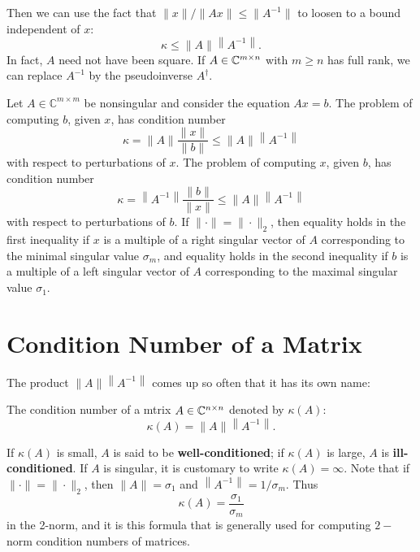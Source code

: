 Then we can use the fact that $\|x\|/ \|Ax\| \le \|A^{-1}\|$ to loosen to a bound independent of $x$: 
\[
    \kappa \leq\|A\|\left\|A^{-1}\right\| .
\]
In fact, $A$ need not have been square. If $A\in \mathbb{C}^{m\times n}$ with $m\ge n$ has full rank, we can replace $A^{-1}$ by the pseudoinverse $A^\dagger $. 


\begin{theorem}
\label{thm: condition number of A}
Let $A \in \mathbb{C}^{m \times m}$ be nonsingular and consider the equation $A x=b$. The problem of computing $b$, given $x$, has condition number
\begin{equation}
    \label{eq: cond of A}
    \kappa=\|A\| \frac{\|x\|}{\|b\|} \leq\|A\|\left\|A^{-1}\right\|
\end{equation}
with respect to perturbations of $x$. The problem of computing $x$, given $b$, has condition number
\begin{equation}
    \label{eq: cond of Ainv}
    \kappa=\left\|A^{-1}\right\| \frac{\|b\|}{\|x\|} \leq\|A\|\left\|A^{-1}\right\|    
\end{equation}
with respect to perturbations of $b$. If $\|\cdot\|=\|\cdot\|_2$, then equality holds in the first inequality if $x$ is a multiple of a right singular vector of $A$ corresponding to the minimal singular value $\sigma_m$, and equality holds in the second inequality if $b$ is a multiple of a left singular vector of $A$ corresponding to the maximal singular value $\sigma_1$.
\end{theorem}

\section{Condition Number of a Matrix}  
The product $\|A\|\left\|A^{-1}\right\|$ comes up so often that it has its own name: 

\begin{definition}
\label{def: Condition number of matrix}
The condition number of a mtrix $A\in \mathbb{C}^{n\times n}$ denoted by $\kappa(A)$: 
\[
    \kappa(A)=\|A\|\left\|A^{-1}\right\| .
\]
\end{definition}

If $\kappa(A)$ is small, $A$ is said to be \textbf{well-conditioned}; if $\kappa(A)$ is large, $A$ is \textbf{ill-conditioned}. If $A$ is singular, it is customary to write $\kappa(A)=\infty$. Note that if $\|\cdot\|=\|\cdot\|_2$, then $\|A\|=\sigma_1$ and $\left\|A^{-1}\right\|=1 / \sigma_m$. Thus
$$
\kappa(A)=\frac{\sigma_1}{\sigma_m}
$$
in the 2-norm, and it is this formula that is generally used for computing $2-$norm condition numbers of matrices. 

